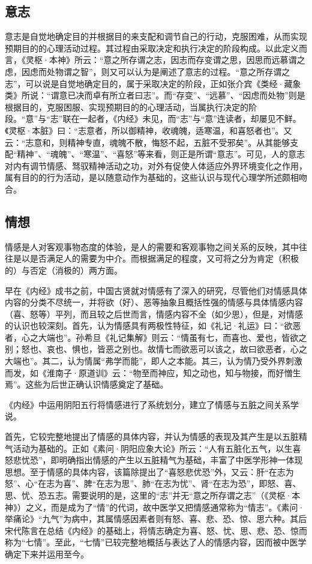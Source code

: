 \documentclass[12pt]{ctexbook}
\begin{document}
\subsection{意志}%

意志是自觉地确定目的并根据目的来支配和调节自己的行动，克服困难，从而实现预期目的的心理活动过程。其过程由采取决定和执行决定的阶段构成。以此定义而言，《灵枢·本神》所云：“意之所存谓之志，因志而存变谓之思，因思而远慕谓之虑，因虑而处物谓之智”，则又可以认为是阐述了意志的过程。“意之所存谓之志”，可以说是自觉地确定目的，属于采取决定的阶段，正如张介宾《类经·藏象类》所说：“谓意已决而卓有所立者曰志”。而“存变”、“远慕”、“因虑而处物”则是根据目的，克服困服、实现预期目的的心理活动，当属执行决定的阶段。“意”与“志”联在一起者，《内经》未见，而“志”与“意”连读者，却屡见不鲜。《灵枢·本脏》曰：“志意者，所以御精神，收魂魄，适寒温，和喜怒者也”。又云：“志意和，则精神专直，魂魄不散，悔怒不起，五脏不受邪矣”。从其能够支配“精神”、“魂魄”、“寒温”、“喜怒”等来看，则正是所谓“意志”。可见，人的意志对内有调节情感、驽驭精神活动之功，对外有促使人体适应外界环境变化之作用，属有目的的行为活动，是以随意动作为基础的，这些认识与现代心理学所述颇相吻合。

\subsection{情想}%

情感是人对客观事物态度的体验，是人的需要和客观事物之间关系的反映，其中往往是以是否满足人的需要为中介。而根据满足的程度，又可将之分为肯定（积极的）与否定（消极的）两方面。

早在《内经》成书之前，中国古贤就对情感有了深入的研究，尽管他们对情感具体内容的分类不尽统一，并将欲（好）、恶等抽象且概括性强的情感与具体情感内容（喜、怒等）平列，而且较之后世而言，情感内容不全（如少思），但是，对情感的认识也较深刻。首先，认为情感具有两极性特征，如《礼记·礼运》曰：“欲恶者，心之大端也”。孙希旦《礼记集解》则云：“情虽有七，而喜也、爱也，皆欲之别；怒也、哀也、惧也，皆恶之别也。故情七而欲恶可以该之，故曰欲恶者，心之大端也”。其二，认为情属“弗学而能”，即人之本能。其三，认为情乃受外界刺激而发，如《淮南子·原道训》云：“物至而神应，知之动也，知与物接，而好憎生焉”。这些为后世正确认识情感奠定了基础。

《内经》中运用阴阳五行将情感进行了系统划分，建立了情感与五脏之间关系学说。

首先，它较完整地提出了情感的具体内容，并认为情感的表现及其产生是以五脏精气活动为基础的。正如《素问·阴阳应象大论》所云：“人有五脏化五气，以生喜怒悲忧恐”，即明确指出情感的产生以五脏精气为基础，丰富了中医学形神一体现思想。至于情感的具体内容，该篇除提出了“喜怒悲优恐”外，又云：肝“在志为怒”、心“在志为喜”、脾“在志为思”、肺“在志为忧”、肾“在志为恐”，即怒、喜、思、忧、恐五志。需要说明的是，这里的“志”并无“意之所存谓之志”（《灵枢·本神》）之义，而是成为了“情”的代词，故中医学又把情感通常称为“情志”。《素问·举痛论》“九气”为病中，其属情感因素者则有怒、喜、悲、恐、惊、思六种。其后宋代陈言在总结《内经》的基础上，将情志确定为喜、怒、忧、思、悲、恐、惊而称为“七情”。至此，“七情”已较完整地概括与表达了人的情感内容，因而被中医学确定下来并运用至今。
\end{document}
